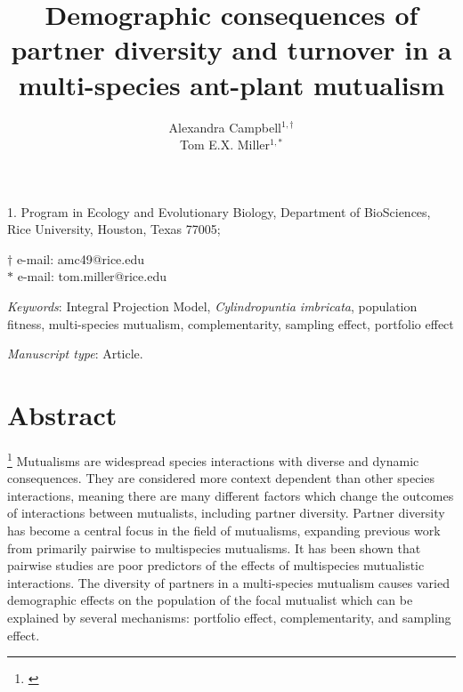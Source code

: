 \documentclass[11pt]{article}
\title{Demographic consequences of partner diversity and turnover in a multi-species ant-plant mutualism}
\author{Alexandra Campbell$^{1,\dagger}$ \\ 
	Tom E.X. Miller$^{1,\ast}$}
\date{}
\newcommand{\tom}[2]{{\color{red}{#1}}\footnote{\textit{\color{red}{#2}}}}
\begin{document}
	
	\maketitle
	
	\noindent{} 1. Program in Ecology and Evolutionary Biology, Department of BioSciences, Rice University, Houston, Texas 77005;
	
	\noindent{} $\dagger$ e-mail: amc49@rice.edu\\
	\noindent{} $\ast$ e-mail: tom.miller@rice.edu
	
	\bigskip
	
	\textit{Keywords}:  Integral Projection Model, \textit{Cylindropuntia imbricata}, population fitness, multi-species mutualism, complementarity, sampling effect, portfolio effect
	
	\bigskip
	
	\textit{Manuscript type}: Article.
	
	\bigskip
	
	
\linenumbers{}
\modulolinenumbers[3]

\newpage{}

\section*{Abstract}
\tom{}{I think this is too long for Am Nat requirements. Also, use ``we''. I think you just pasted in an abstract that you used elsewhere, so I will work on this once you write a real abstract for the Am Nat paper.}
Mutualisms are widespread species interactions with diverse and dynamic consequences. 
They are considered more context dependent than other species interactions, meaning there are many different factors which change the outcomes of interactions between mutualists, including partner diversity. 
Partner diversity has become a central focus in the field of mutualisms, expanding previous work from primarily pairwise to multispecies mutualisms. 
It has been shown that pairwise studies are poor predictors of the effects of multispecies mutualistic interactions. 
The diversity of partners in a multi-species mutualism causes varied demographic effects on the population of the focal mutualist which can be explained by several mechanisms: portfolio effect, complementarity, and sampling effect. 
\end{document}
